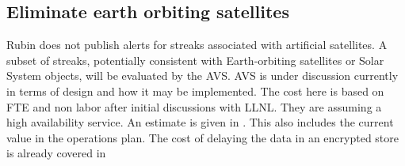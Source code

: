 
\subsection{Eliminate earth orbiting satellites} \label{sec:4eliminate}

Rubin does not publish alerts for streaks associated with artificial satellites.
A subset of streaks, potentially consistent with Earth-orbiting satellites or Solar System objects, will be evaluated by the \gls{AVS}.
AVS is under discussion currently in terms of design and how it may be implemented.
The cost here is based on FTE  and non labor after initial discussions with \gls{LLNL}.
They are assuming a high availability service.
An estimate is given in . This also includes the current value in the operations plan.
The cost of delaying the data in an encrypted store is already covered in 





